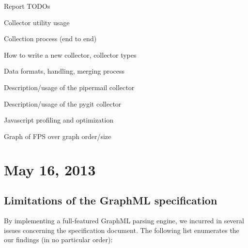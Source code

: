 \begin{todos}{Report TODOs}
    \item Collector utility usage
    \item Collection process (end to end)
    \item How to write a new collector, collector types
    \item Data formats, handling, merging process
    \item Description/usage of the pipermail collector
    \item Description/usage of the pygit collector
    \item Javascript profiling and optimization
    \item Graph of FPS over graph order/size
\end{todos}

\section{May 16, 2013}

\subsection{Limitations of the GraphML specification}

By implementing a full-featured GraphML parsing engine, we incurred in several issues concerning the specification document. The following list enumerates the our findings (in no particular order):

